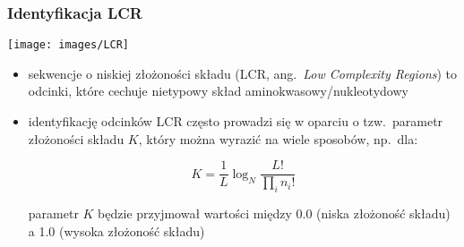 \begin{frame}
\frametitle{Identyfikacja LCR}

\begin{minipage}[t]{.5\textwidth}\vspace{0pt}
\texttt{[image: images/LCR]}
\end{minipage}%
\begin{minipage}[t]{.48\textwidth}\vspace{0pt}
\raggedright\scriptsize
\begin{itemize}

 \item sekwencje o niskiej złożoności składu (LCR, ang.\ \emph{Low
 Complexity Regions}) to odcinki, które cechuje nietypowy skład
 aminokwasowy/nukleotydowy

 \item identyfikację odcinków LCR często prowadzi się w oparciu o
 tzw.\ parametr złożoności składu $K$, który można wyrazić na wiele
 sposobów, np.\ dla:

 {\[ K = \frac{1}{L} \log_N \frac{L!}{\prod_i n_i!}
 \]}

 parametr $K$ będzie przyjmował wartości między 0.0 (niska złożoność
 składu) a 1.0 (wysoka złożoność składu)

\end{itemize}
\end{minipage}
\end{frame}

